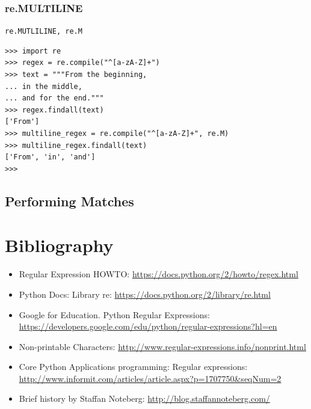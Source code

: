 \documentclass{beamer}
\begin{document}
\subsubsection{re.MULTILINE}
\begin{frame}[fragile]
\verb/re.MUTLILINE, re.M/ \\
\begin{lstlisting}
>>> import re
>>> regex = re.compile("^[a-zA-Z]+")
>>> text = """From the beginning,
... in the middle,
... and for the end."""
>>> regex.findall(text)
['From']
>>> multiline_regex = re.compile("^[a-zA-Z]+", re.M)
>>> multiline_regex.findall(text)
['From', 'in', 'and']
>>>
\end{lstlisting}
\end{frame}

\subsection{Performing Matches}
\begin{frame}[fragile]
\end{frame}

\section{Bibliography}
\begin{frame}
\begingroup
 \fontsize{6pt}{8pt}\selectfont
\begin{itemize}
\item Regular Expression HOWTO: \url{https://docs.python.org/2/howto/regex.html}
\item Python Docs: Library re: \url{https://docs.python.org/2/library/re.html}
\item Google for Education. Python Regular Expressions: \url{https://developers.google.com/edu/python/regular-expressions?hl=en}
\item Non-printable Characters: \url{http://www.regular-expressions.info/nonprint.html}
\item Core Python Applications programming: Regular expressions: \url{http://www.informit.com/articles/article.aspx?p=1707750&seqNum=2}
\item Brief history by Staffan Noteberg: \url{http://blog.staffannoteberg.com/}
\end{itemize}
\endgroup
\end{frame}
\end{document}
